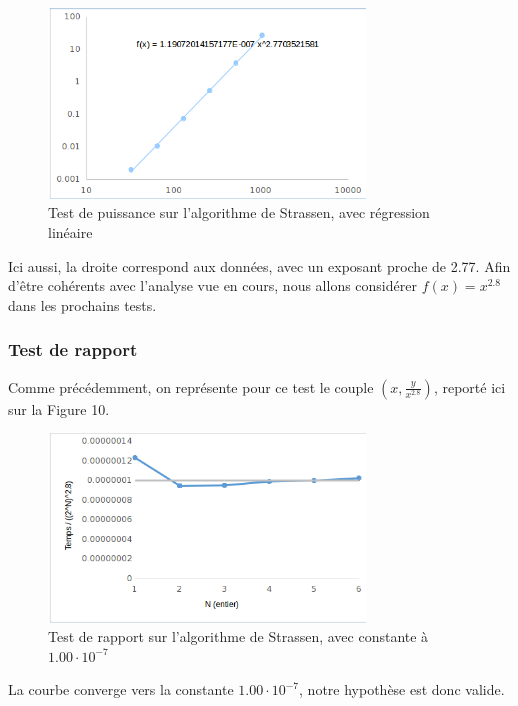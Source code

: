 \documentclass[10pt,a4paper]{article}
\begin{document}
\begin{figure}[h!]
	\centering
	\includegraphics[width=0.75\textwidth]{spreadsheet/graph6}
	\caption{Test de puissance sur l'algorithme de Strassen, avec régression linéaire}
\end{figure}

Ici aussi, la droite correspond aux données, avec un exposant proche de 2.77. Afin d'être cohérents avec l'analyse vue en cours, nous allons considérer $ f(x) = x^{2.8} $ dans les prochains tests.

\subsubsection{Test de rapport}

Comme précédemment, on représente pour ce test le couple $ (x,  \frac{y}{x^{2.8}}) $, reporté ici sur la Figure 10.

\newpage

\begin{figure}[h!]
	\centering
	\includegraphics[width=0.75\textwidth]{spreadsheet/graph8}
	\caption{Test de rapport sur l'algorithme de Strassen, avec constante à $ 1.00 \cdot 10^{-7} $}
\end{figure}

La courbe converge vers la constante $ 1.00 \cdot 10^{-7} $, notre hypothèse est donc valide.
\end{document}
